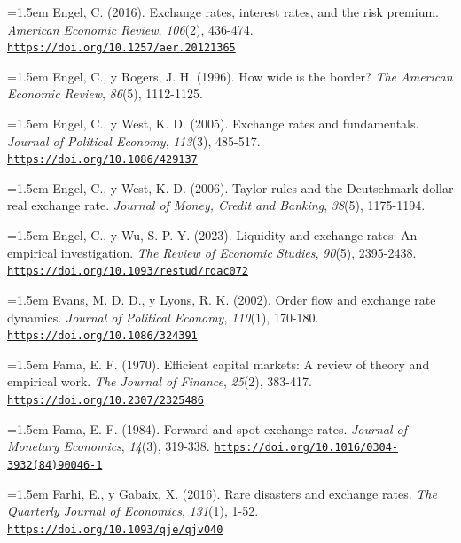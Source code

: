 \documentclass[10pt,a4paper]{article}
\begin{document}
\noindent\hangindent=1.5em Engel, C. (2016). Exchange rates, interest rates, and the risk premium. \textit{American Economic Review}, \textit{106}(2), 436-474. \href{https://doi.org/10.1257/aer.20121365}{\nolinkurl{https://doi.org/10.1257/aer.20121365}}

\noindent\hangindent=1.5em Engel, C., y Rogers, J. H. (1996). How wide is the border? \textit{The American Economic Review}, \textit{86}(5), 1112-1125.

\noindent\hangindent=1.5em Engel, C., y West, K. D. (2005). Exchange rates and fundamentals. \textit{Journal of Political Economy}, \textit{113}(3), 485-517. \href{https://doi.org/10.1086/429137}{\nolinkurl{https://doi.org/10.1086/429137}}

\noindent\hangindent=1.5em Engel, C., y West, K. D. (2006). Taylor rules and the Deutschmark-dollar real exchange rate. \textit{Journal of Money, Credit and Banking}, \textit{38}(5), 1175-1194.

\noindent\hangindent=1.5em Engel, C., y Wu, S. P. Y. (2023). Liquidity and exchange rates: An empirical investigation. \textit{The Review of Economic Studies}, \textit{90}(5), 2395-2438. \href{https://doi.org/10.1093/restud/rdac072}{\nolinkurl{https://doi.org/10.1093/restud/rdac072}}

\noindent\hangindent=1.5em Evans, M. D. D., y Lyons, R. K. (2002). Order flow and exchange rate dynamics. \textit{Journal of Political Economy}, \textit{110}(1), 170-180. \href{https://doi.org/10.1086/324391}{\nolinkurl{https://doi.org/10.1086/324391}}

\noindent\hangindent=1.5em Fama, E. F. (1970). Efficient capital markets: A review of theory and empirical work. \textit{The Journal of Finance}, \textit{25}(2), 383-417. \href{https://doi.org/10.2307/2325486}{\nolinkurl{https://doi.org/10.2307/2325486}}

\noindent\hangindent=1.5em Fama, E. F. (1984). Forward and spot exchange rates. \textit{Journal of Monetary Economics}, \textit{14}(3), 319-338. \href{https://doi.org/10.1016/0304-3932(84)90046-1}{\nolinkurl{https://doi.org/10.1016/0304-3932(84)90046-1}}

\noindent\hangindent=1.5em Farhi, E., y Gabaix, X. (2016). Rare disasters and exchange rates. \textit{The Quarterly Journal of Economics}, \textit{131}(1), 1-52. \href{https://doi.org/10.1093/qje/qjv040}{\nolinkurl{https://doi.org/10.1093/qje/qjv040}}
\end{document}
